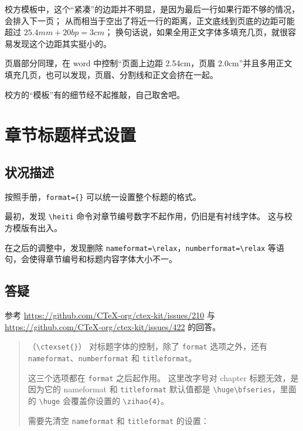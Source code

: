 \documentclass[../Main/thesis.tex]{subfiles}
\begin{document}
校方模板中，这个``紧凑''的边距并不明显，是因为最后一行如果行距不够的情况，会排入下一页；
从而相当于空出了将近一行的距离，正文底线到页底的边距可能超过
\(25.4mm + 20bp = 3cm\)；
换句话说，如果全用正文字体多填充几页，就很容易发现这个边距其实挺小的。

页眉部分同理，在 word 中控制``页面上边距 2.54cm，页眉
2.0cm''并且多用正文填充几页，也可以发现，页眉、分割线和正文会挤在一起。

校方的``模板''有的细节经不起推敲，自己取舍吧。

\section{章节标题样式设置}

\subsection{状况描述}

按照手册，\texttt{format=\{\}} 可以统一设置整个标题的格式。

最初，发现 \texttt{\textbackslash{}heiti}
命令对章节编号数字不起作用，仍旧是有衬线字体。 这与校方模版有出入。

在之后的调整中，发现删除
\texttt{nameformat=\textbackslash{}relax}，\texttt{numberformat=\textbackslash{}relax}
等语句，会使得章节编号和标题内容字体大小不一。

\subsection{答疑}

参考 \url{https://github.com/CTeX-org/ctex-kit/issues/210} 与
\url{https://github.com/CTeX-org/ctex-kit/issues/422} 的回答。

\begin{quote}
（\texttt{\textbackslash{}ctexset\{\}}） 对标题字体的控制，除了
\texttt{format} 选项之外，还有
\texttt{nameformat}、\texttt{numberformat} 和 \texttt{titleformat}。

这三个选项都在 \texttt{format} 之后起作用。 这里改字号对 chapter
标题无效，是因为它的 nameformat 和 \texttt{titleformat} 默认值都是
\texttt{\textbackslash{}huge\textbackslash{}bfseries}，里面的
\texttt{\textbackslash{}huge} 会覆盖你设置的
\texttt{\textbackslash{}zihao\{4\}}。

需要先清空 \texttt{nameformat} 和 \texttt{titleformat} 的设置：
\end{quote}

\begin{Shaded}
\begin{Highlighting}[]
\NormalTok{[zihao=-4]\{}\NormalTok{\}}
\NormalTok{\{}
\NormalTok{,}
\NormalTok{\}}
\end{Highlighting}
\end{Shaded}
\end{document}
